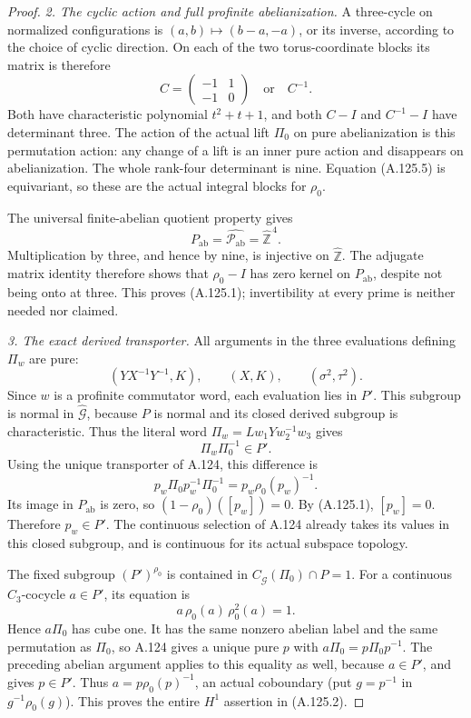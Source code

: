 \begin{proof}
\emph{2. The cyclic action and full profinite abelianization.}
A three-cycle on normalized configurations is
\((a,b)\mapsto(b-a,-a)\), or its inverse, according to the
choice of cyclic direction. On each of the two torus-coordinate
blocks its matrix is therefore
\[
 C=\begin{pmatrix}-1&1\\-1&0\end{pmatrix}
 \quad\text{or}\quad C^{-1}.
\]
Both have characteristic polynomial \(t^2+t+1\), and both
\(C-I\) and \(C^{-1}-I\) have determinant three.
The action of the actual lift \(\Pi_0\) on pure abelianization
is this permutation action: any change of a lift is an inner
pure action and disappears on abelianization.
The whole rank-four determinant is nine.
Equation (A.125.5) is equivariant, so these are the actual
integral blocks for \(\rho_0\).

The universal finite-abelian quotient property gives
\[
 P_{\mathrm{ab}}
   =\widehat{\mathcal P_{\mathrm{ab}}}
   =\widehat{\mathbb Z}^{\,4}.
\]
Multiplication by three, and hence by nine, is injective
on \(\widehat{\mathbb Z}\). The adjugate matrix identity
therefore shows that \(\rho_0-I\) has zero kernel on
\(P_{\mathrm{ab}}\), despite not being onto at three.
This proves (A.125.1); invertibility at every prime is
neither needed nor claimed.

\emph{3. The exact derived transporter.}
All arguments in the three evaluations defining \(\Pi_w\)
are pure:
\[
 (YX^{-1}Y^{-1},K),\qquad (X,K),\qquad
 (\sigma^2,\tau^2).
\]
Since \(w\) is a profinite commutator word, each evaluation
lies in \(P'\). This subgroup is normal in
\(\widehat{\mathcal G}\), because \(P\) is normal and its
closed derived subgroup is characteristic. Thus the literal
word \(\Pi_w=Lw_1Yw_2^{-1}w_3\) gives
\[
 \Pi_w\Pi_0^{-1}\in P'.
\]
Using the unique transporter of A.124, this difference is
\[
 p_w\Pi_0p_w^{-1}\Pi_0^{-1}
          =p_w\rho_0(p_w)^{-1}.
\]
Its image in \(P_{\mathrm{ab}}\) is zero, so
\((1-\rho_0)([p_w])=0\). By (A.125.1), \([p_w]=0\).
Therefore \(p_w\in P'\). The continuous selection of A.124
already takes its values in this closed subgroup, and is
continuous for its actual subspace topology.

The fixed subgroup \((P')^{\rho_0}\) is contained in
\(C_{\widehat{\mathcal G}}(\Pi_0)\cap P=1\).
For a continuous \(C_3\)-cocycle \(a\in P'\), its equation is
\[
 a\,\rho_0(a)\,\rho_0^2(a)=1.
\]
Hence \(a\Pi_0\) has cube one. It has the same nonzero
abelian label and the same permutation as \(\Pi_0\), so
A.124 gives a unique pure \(p\) with
\(a\Pi_0=p\Pi_0p^{-1}\).
The preceding abelian argument applies to this equality
as well, because \(a\in P'\), and gives \(p\in P'\).
Thus \(a=p\rho_0(p)^{-1}\), an actual coboundary
(put \(g=p^{-1}\) in \(g^{-1}\rho_0(g)\)).
This proves the entire \(H^1\) assertion in (A.125.2).


\end{proof}

